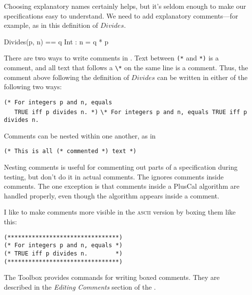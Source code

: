 Choosing explanatory names certainly helps, but it's seldom
enough to make our specifications easy to understand.  We need to add
explanatory comments---for example, as in this definition
of $Divides$.
\begin{display}
\begin{notla}
Divides(p, n) == \E q \in Int : n = q * p
\end{notla}
\begin{tlatex}
\end{tlatex}
\par
\mbox{}
\end{display}
There are two ways to write comments in \tlaplus.  Text between
\verb|(*| and \verb|*)| is a comment, and all text that follows a
\verb|\*| on the same line is a comment.  Thus, the comment above
following the definition of $Divides$ can be written in either of
the following two ways:
\begin{display}
\verb|(* For integers p and n, equals   |\\
\verb|   TRUE iff p divides n. *)| 
\verb|\* For integers p and n, equals TRUE iff p divides n.|
\end{display}
Comments can be nested within one another, as in
\begin{display}
\verb|(* This is all (* commented *) text *)|
\end{display}
Nesting comments is useful for commenting out parts of a specification
during testing, but don't do it in actual comments.  The
 ignores comments inside
comments.  The one exception is that comments inside a PlusCal
algorithm are handled properly, even though the algorithm appears
inside a comment.

I like to make comments more visible in the \textsc{ascii} version
by 
boxing them like this:
\begin{display}
\verb|(********************************)|\\
\verb|(* For integers p and n, equals *)|\\
\verb|(* TRUE iff p divides n.        *)|\\
\verb|(********************************)|
\end{display}
The Toolbox provides commands for writing boxed comments.  They are
described in the \emph{Editing Comments} section of the
.


